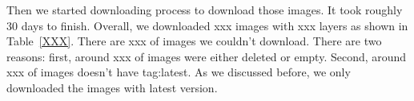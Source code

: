 Then we started downloading process to download those images. It took roughly 30 days to finish. Overall, we downloaded xxx images with xxx layers as shown in Table~\ref{XXX}. There are xxx of images we couldn't download. There are two reasons: first, around xxx of images were either deleted or empty. Second, around xxx of images doesn't have tag:latest. As we discussed before, we only downloaded the images with latest version.

%
%
